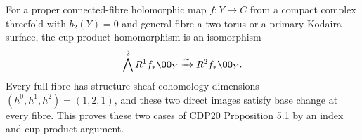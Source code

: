 
\begin{proposition}\hypertarget{tag-01FX}{}\label{cdp:st:D.1.12}


For a proper connected-fibre holomorphic map $f:Y\to C$ from a
compact complex threefold with $b_2(Y)=0$ and general fibre a
two-torus or a primary Kodaira surface, the cup-product homomorphism
is an isomorphism
\[
\bigwedge^2R^1f_*\OO_Y\xrightarrow{\simeq}R^2f_*\OO_Y.
\]
Every full fibre has structure-sheaf cohomology dimensions
$(h^0,h^1,h^2)=(1,2,1)$, and these two direct images satisfy
base change at every fibre. This proves these two cases of CDP20
Proposition 5.1 by an index and cup-product argument.
\end{proposition}

